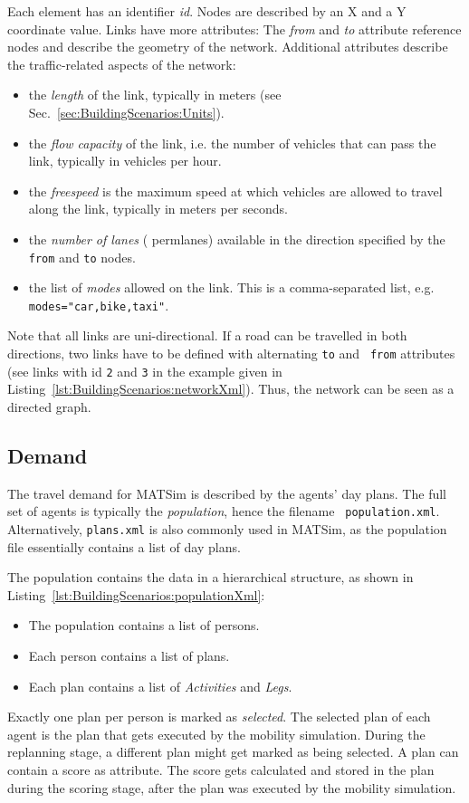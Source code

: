 Each element has an identifier \emph{id}. Nodes are described by an X and a Y
coordinate value. Links have more attributes: The \emph{from} and \emph{to}
attribute reference nodes and describe the geometry of the network. Additional
attributes describe the traffic-related aspects of the network:
\begin{itemize}\styleItemize
  \item the \emph{length} of the link, typically in meters (see
  Sec.~\ref{sec:BuildingScenarios:Units}).
  \item the \emph{flow capacity} of the link, i.e. the number of vehicles that
  can pass the link, typically in vehicles per hour.
  \item the \emph{freespeed} is the maximum speed at which vehicles are allowed
  to travel along the link, typically in meters per seconds.
  \item the \emph{number of lanes} ({\tt} permlanes) available in the direction
  specified by the {\tt from} and {\tt to} nodes.
  \item the list of \emph{modes} allowed on the link. This is a comma-separated
  list, e.g. {\tt modes="car,bike,taxi"}.
\end{itemize}
Note that all links are uni-directional. If a road can be travelled in both
directions, two links have to be defined with alternating {\tt to} and {\tt
from} attributes (see links with id {\tt 2} and {\tt 3} in the example given in
Listing~\ref{lst:BuildingScenarios:networkXml}).
Thus, the network can be seen as a directed graph.


\subsection{Demand}

The travel demand for MATSim is described by the agents' day plans. The full set
of agents is typically the \emph{population}, hence the filename {\tt
population.xml}. Alternatively, {\tt plans.xml} is also commonly used in MATSim,
as the population file essentially contains a list of day plans.

The population contains the data in a hierarchical structure, as shown in
Listing~\ref{lst:BuildingScenarios:populationXml}:
\begin{itemize}\styleItemize
  \item The population contains a list of persons.
  \item Each person contains a list of plans.
  \item Each plan contains a list of \emph{Activities} and \emph{Legs}.
\end{itemize}
Exactly one plan per person is marked as \emph{selected}. The selected plan of
each agent is the plan that gets executed by the mobility simulation. During the
replanning stage, a different plan might get marked as being selected. A plan
can contain a score as attribute. The score gets calculated and stored in the
plan during the scoring stage, after the plan was executed by the mobility
simulation.

